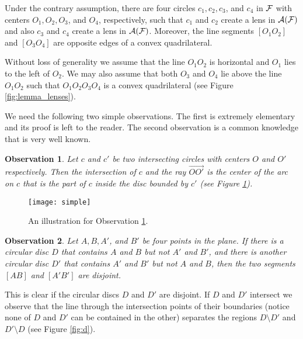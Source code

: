 \documentclass[11pt,a4paper]{article}
\newcommand{\F}{{\cal{F}}}
\newcommand{\A}{{\cal{A}}}
\newcommand{\bbox}{\vrule height7pt width4pt depth1pt}
\newtheorem{observation}{Observation}
\begin{document}
\bigskip

Under the contrary assumption, there are four circles $c_{1}, c_{2}, c_{3}$, and $c_{4}$ in $\F$ 
with centers $O_{1}, O_{2}, O_{3}$, and $O_{4}$, respectively,
such that $c_{1}$ and $c_{2}$ create a lens in $\A(\F)$ and also $c_{3}$ and $c_{4}$ create a lens in $\A(\F)$. Moreover, the line segments 
$[O_{1}O_{2}]$ and $[O_{3}O_{4}]$ are 
opposite edges of a convex quadrilateral.

Without loss of generality we assume that the line $O_{1}O_{2}$ is horizontal and
$O_{1}$ lies to the left of $O_{2}$. We may also assume that both $O_{3}$ and $O_{4}$ lie 
above the line $O_{1}O_{2}$ such that 
$O_{1}O_{2}O_{3}O_{4}$ is a convex quadrilateral (see Figure \ref{fig:lemma_lenses}).


We need the following two simple observations.
The first is extremely elementary and its proof is left to the reader. The second observation is a common knowledge that is very well known.

\begin{observation}\label{observation:simple}
Let $c$ and $c'$ be two intersecting circles
with centers $O$ and $O'$ respectively.
Then the intersection of $c$ and the ray $\overrightarrow{OO'}$ is the center of the arc
on $c$ that is the part of $c$ inside the disc bounded by $c'$ (see Figure \ref{fig:simple}).
\end{observation}

\begin{figure}[ht]
	\centering
	\texttt{[image: simple]}
	\caption{An illustration for Observation \ref{observation:simple}.}
	\label{fig:simple}
\end{figure}

\begin{observation}\label{observation:d}
Let $A,B,A'$, and $B'$ be four points in the plane.
If there is a circular disc $D$ that contains $A$ and $B$ but not $A'$ and $B'$, and there is another circular disc $D'$ that contains $A'$ and $B'$ but not $A$ and $B$, then the two segments $[AB]$ and $[A'B']$ are disjoint.
\end{observation}

 This is clear if the circular discs
$D$ and $D'$ are disjoint. If $D$ and $D'$ intersect
we observe that the line through the intersection points
of their boundaries (notice none of $D$ and $D'$ can be contained in the other)  separates the regions $D \setminus D'$ and $D' \setminus D$
(see Figure \ref{fig:d}).
\bbox
\end{document}
